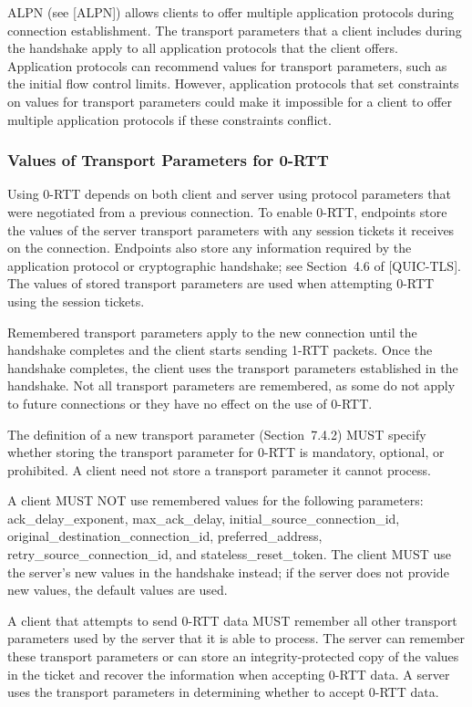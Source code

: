 \documentclass{article}
\begin{document}
ALPN (see [ALPN]) allows clients to offer multiple application protocols during connection establishment.  The transport parameters that a client includes during the handshake apply to all application protocols that the client offers.  Application protocols can recommend values for transport parameters, such as the initial flow control limits.  However, application protocols that set constraints on values for transport parameters could make it impossible for a client to offer multiple application protocols if these constraints conflict.

\subsubsection{Values of Transport Parameters for 0-RTT}

Using 0-RTT depends on both client and server using protocol parameters that were negotiated from a previous connection.  To enable 0-RTT, endpoints store the values of the server transport parameters with any session tickets it receives on the connection. Endpoints also store any information required by the application protocol or cryptographic handshake; see Section~4.6 of [QUIC-TLS]. The values of stored transport parameters are used when attempting 0-RTT using the session tickets.

Remembered transport parameters apply to the new connection until the handshake completes and the client starts sending 1-RTT packets. Once the handshake completes, the client uses the transport parameters established in the handshake.  Not all transport parameters are remembered, as some do not apply to future connections or they have no effect on the use of 0-RTT.

The definition of a new transport parameter (Section~7.4.2) MUST specify whether storing the transport parameter for 0-RTT is mandatory, optional, or prohibited.  A client need not store a transport parameter it cannot process.

A client MUST NOT use remembered values for the following parameters: ack\_delay\_exponent, max\_ack\_delay, initial\_source\_connection\_id, original\_destination\_connection\_id, preferred\_address, retry\_source\_connection\_id, and stateless\_reset\_token.  The client MUST use the server's new values in the handshake instead; if the server does not provide new values, the default values are used.

A client that attempts to send 0-RTT data MUST remember all other transport parameters used by the server that it is able to process. The server can remember these transport parameters or can store an integrity-protected copy of the values in the ticket and recover the information when accepting 0-RTT data.  A server uses the transport parameters in determining whether to accept 0-RTT data.
\end{document}
